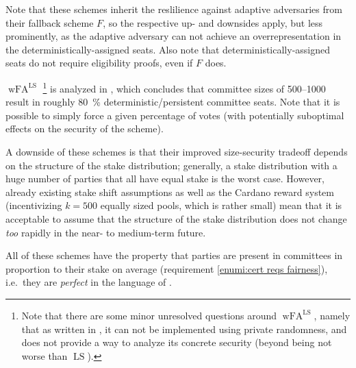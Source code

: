 \begin{enumerate}
  Note that these schemes inherit the reslilience against adaptive adversaries from their fallback scheme $F$, so the respective up- and downsides apply, but less prominently, as the adaptive adversary can not achieve an overrepresentation in the deterministically-assigned seats.
  Also note that deterministically-assigned seats do not require eligibility proofs, even if $F$ does.

  $\operatorname{wFA}^{\operatorname{LS}}$%
  \footnote{Note that there are some minor unresolved questions around $\operatorname{wFA}^{\operatorname{LS}}$, namely that as written in \cite{gavzi2023fait}, it can not be implemented using private randomness, and \cite{gavzi2023fait} does not provide a way to analyze its concrete security (beyond being not worse than $\operatorname{LS}$).}
  is analyzed in \cite{peras-cert-report}, which concludes that committee sizes of \numrange{500}{1000} result in roughly \qty{80}{\percent} deterministic/persistent committee seats.
  Note that it is possible to simply force a given percentage of votes (with potentially suboptimal effects on the security of the scheme).

  A downside of these schemes is that their improved size-security tradeoff depends on the structure of the stake distribution; generally, a stake distribution with a huge number of parties that all have equal stake is the worst case.
  However, already existing stake shift assumptions as well as the Cardano reward system (incentivizing $k = 500$ equally sized pools, which is rather small) mean that it is acceptable to assume that the structure of the stake distribution does not change \emph{too} rapidly in the near- to medium-term future.
\end{enumerate}

All of these schemes have the property that parties are present in committees in proportion to their stake on average (requirement \ref{enumi:cert reqs fairness}), i.e.\ they are \emph{perfect} in the language of \cite{gavzi2023fait}.

